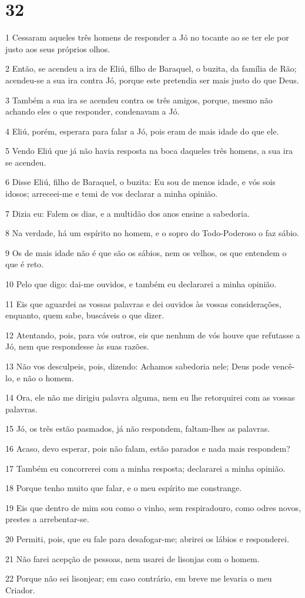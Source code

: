 \chapter{32}

\par 1 Cessaram aqueles três homens de responder a Jó no tocante ao se ter ele por justo aos seus próprios olhos.
\par 2 Então, se acendeu a ira de Eliú, filho de Baraquel, o buzita, da família de Rão; acendeu-se a sua ira contra Jó, porque este pretendia ser mais justo do que Deus.
\par 3 Também a sua ira se acendeu contra os três amigos, porque, mesmo não achando eles o que responder, condenavam a Jó.
\par 4 Eliú, porém, esperara para falar a Jó, pois eram de mais idade do que ele.
\par 5 Vendo Eliú que já não havia resposta na boca daqueles três homens, a sua ira se acendeu.
\par 6 Disse Eliú, filho de Baraquel, o buzita: Eu sou de menos idade, e vós sois idosos; arreceei-me e temi de vos declarar a minha opinião.
\par 7 Dizia eu: Falem os dias, e a multidão dos anos ensine a sabedoria.
\par 8 Na verdade, há um espírito no homem, e o sopro do Todo-Poderoso o faz sábio.
\par 9 Os de mais idade não é que são os sábios, nem os velhos, os que entendem o que é reto.
\par 10 Pelo que digo: dai-me ouvidos, e também eu declararei a minha opinião.
\par 11 Eis que aguardei as vossas palavras e dei ouvidos às vossas considerações, enquanto, quem sabe, buscáveis o que dizer.
\par 12 Atentando, pois, para vós outros, eis que nenhum de vós houve que refutasse a Jó, nem que respondesse às suas razões.
\par 13 Não vos desculpeis, pois, dizendo: Achamos sabedoria nele; Deus pode vencê-lo, e não o homem.
\par 14 Ora, ele não me dirigiu palavra alguma, nem eu lhe retorquirei com as vossas palavras.
\par 15 Jó, os três estão pasmados, já não respondem, faltam-lhes as palavras.
\par 16 Acaso, devo esperar, pois não falam, estão parados e nada mais respondem?
\par 17 Também eu concorrerei com a minha resposta; declararei a minha opinião.
\par 18 Porque tenho muito que falar, e o meu espírito me constrange.
\par 19 Eis que dentro de mim sou como o vinho, sem respiradouro, como odres novos, prestes a arrebentar-se.
\par 20 Permiti, pois, que eu fale para desafogar-me; abrirei os lábios e responderei.
\par 21 Não farei acepção de pessoas, nem usarei de lisonjas com o homem.
\par 22 Porque não sei lisonjear; em caso contrário, em breve me levaria o meu Criador.

